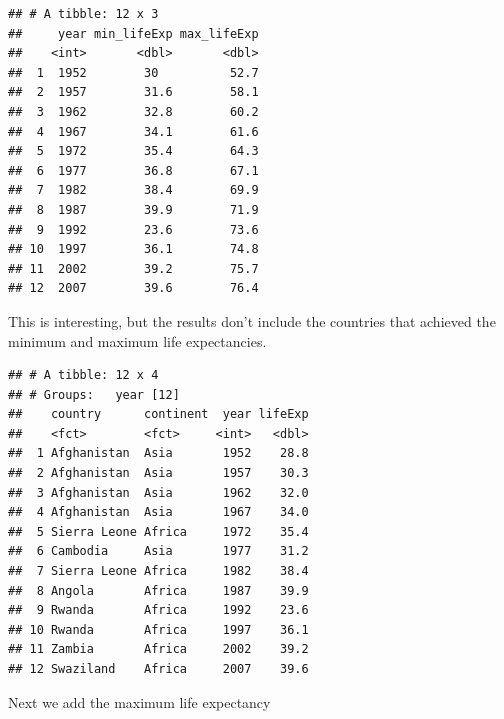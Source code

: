 \documentclass[]{article}
\newenvironment{Shaded}{\begin{snugshade}}{\end{snugshade}}
\newcommand{\KeywordTok}[1]{\textcolor[rgb]{0.13,0.29,0.53}{\textbf{#1}}}
\newcommand{\DataTypeTok}[1]{\textcolor[rgb]{0.13,0.29,0.53}{#1}}
\newcommand{\DecValTok}[1]{\textcolor[rgb]{0.00,0.00,0.81}{#1}}
\newcommand{\StringTok}[1]{\textcolor[rgb]{0.31,0.60,0.02}{#1}}
\newcommand{\OperatorTok}[1]{\textcolor[rgb]{0.81,0.36,0.00}{\textbf{#1}}}
\newcommand{\NormalTok}[1]{#1}
\begin{document}
\begin{verbatim}
## # A tibble: 12 x 3
##     year min_lifeExp max_lifeExp
##    <int>       <dbl>       <dbl>
##  1  1952        30          52.7
##  2  1957        31.6        58.1
##  3  1962        32.8        60.2
##  4  1967        34.1        61.6
##  5  1972        35.4        64.3
##  6  1977        36.8        67.1
##  7  1982        38.4        69.9
##  8  1987        39.9        71.9
##  9  1992        23.6        73.6
## 10  1997        36.1        74.8
## 11  2002        39.2        75.7
## 12  2007        39.6        76.4
\end{verbatim}

This is interesting, but the results don't include the countries that
achieved the minimum and maximum life expectancies.

\begin{Shaded}
\end{Shaded}

\begin{verbatim}
## # A tibble: 12 x 4
## # Groups:   year [12]
##    country      continent  year lifeExp
##    <fct>        <fct>     <int>   <dbl>
##  1 Afghanistan  Asia       1952    28.8
##  2 Afghanistan  Asia       1957    30.3
##  3 Afghanistan  Asia       1962    32.0
##  4 Afghanistan  Asia       1967    34.0
##  5 Sierra Leone Africa     1972    35.4
##  6 Cambodia     Asia       1977    31.2
##  7 Sierra Leone Africa     1982    38.4
##  8 Angola       Africa     1987    39.9
##  9 Rwanda       Africa     1992    23.6
## 10 Rwanda       Africa     1997    36.1
## 11 Zambia       Africa     2002    39.2
## 12 Swaziland    Africa     2007    39.6
\end{verbatim}

Next we add the maximum life expectancy

\begin{Shaded}
\end{Shaded}
\end{document}
